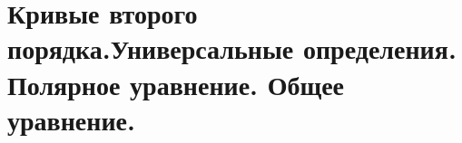 \section{Кривые второго порядка.Универсальные определения. Полярное уравнение. Общее уравнение.}

\pagebreak